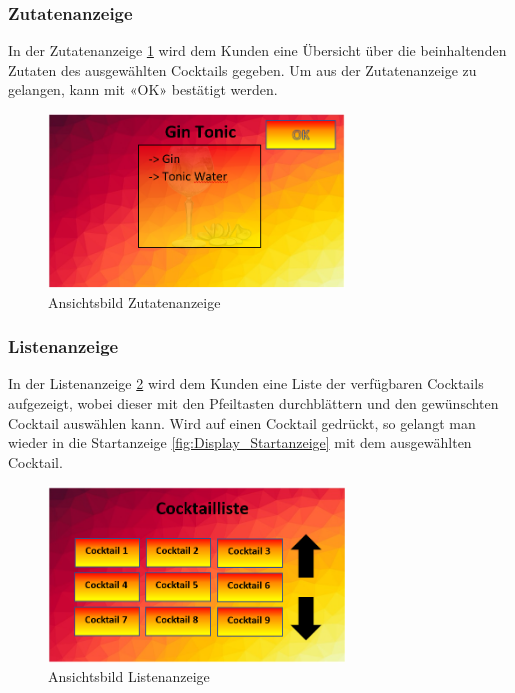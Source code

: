 \subsubsection{Zutatenanzeige}\label{subsubsec:Display_Zutatenanzeige}

In der Zutatenanzeige \ref{fig:Display_Zutatenanzeige} wird dem Kunden eine Übersicht über die beinhaltenden Zutaten des ausgewählten Cocktails gegeben. Um aus der Zutatenanzeige zu gelangen, kann mit «OK» bestätigt werden.

\begin{figure}[h!]
\centering
\includegraphics[width=0.7\textwidth]{graphics/Display_Zutatenanzeige.png}
\caption{Ansichtsbild Zutatenanzeige}
\label{fig:Display_Zutatenanzeige}
\end{figure}

\subsubsection{Listenanzeige}\label{subsubsec:Display_Listenanzeige}

In der Listenanzeige \ref{fig:Display_Listenanzeige} wird dem Kunden eine Liste der verfügbaren Cocktails aufgezeigt, wobei dieser mit den Pfeiltasten durchblättern und den gewünschten Cocktail auswählen kann. Wird auf einen Cocktail gedrückt, so gelangt man wieder in die Startanzeige \ref{fig:Display_Startanzeige} mit dem ausgewählten Cocktail.

\begin{figure}[h!]
\centering
\includegraphics[width=0.7\textwidth]{graphics/Display_Listenanzeige.png}
\caption{Ansichtsbild Listenanzeige}
\label{fig:Display_Listenanzeige}
\end{figure}

